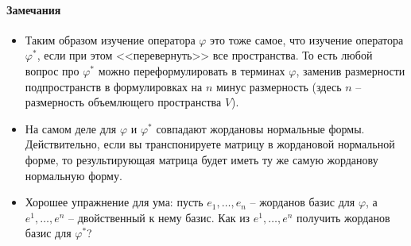 \paragraph{Замечания}
\begin{itemize}
\item Таким образом изучение оператора $\varphi$ это тоже самое, что изучение оператора $\varphi^*$, если при этом <<перевернуть>> все пространства. То есть любой вопрос про $\varphi^*$ можно переформулировать в терминах $\varphi$, заменив размерности подпространств в формулировках на $n$ минус размерность (здесь $n$ -- размерность объемлющего пространства $V$).

\item На самом деле для $\varphi$ и $\varphi^*$ совпадают жордановы нормальные формы. Действительно, если вы транспонируете матрицу в жордановой нормальной форме, то результирующая матрица будет иметь ту же самую жорданову нормальную форму.

\item Хорошее упражнение для ума: пусть $e_1,\ldots,e_n$ -- жорданов базис для $\varphi$, а $e^1,\ldots,e^n$ -- двойственный к нему базис. Как из $e^1,\ldots,e^n$ получить жорданов базис для $\varphi^*$?
\end{itemize}

